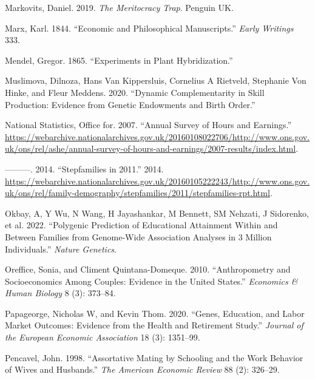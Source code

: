 \documentclass[
]{article}
\newlength{\cslhangindent}
\newlength{\cslentryspacingunit} %
\newenvironment{CSLReferences}[2] %
 {%
  \setlength{\parindent}{0pt}
  \ifodd #1
  \let\oldpar\par
  \def\par{\hangindent=\cslhangindent\oldpar}
  \fi
  \setlength{\parskip}{#2\cslentryspacingunit}
 }%
 {}
\theoremstyle{definition}
\theoremstyle{definition}
\theoremstyle{definition}
\theoremstyle{definition}
\theoremstyle{remark}
\begin{document}
\begin{CSLReferences}{1}{0}
\leavevmode{}%
Markovits, Daniel. 2019. \emph{The Meritocracy Trap}. Penguin UK.

\leavevmode{}%
Marx, Karl. 1844. {``Economic and Philosophical Manuscripts.''} \emph{Early Writings} 333.

\leavevmode{}%
Mendel, Gregor. 1865. {``Experiments in Plant Hybridization.''}

\leavevmode{}%
Muslimova, Dilnoza, Hans Van Kippersluis, Cornelius A Rietveld, Stephanie Von Hinke, and Fleur Meddens. 2020. {``Dynamic Complementarity in Skill Production: Evidence from Genetic Endowments and Birth Order.''}

\leavevmode{}%
National Statistics, Office for. 2007. {``Annual Survey of Hours and Earnings.''} \url{https://webarchive.nationalarchives.gov.uk/20160108022706/http://www.ons.gov.uk/ons/rel/ashe/annual-survey-of-hours-and-earnings/2007-results/index.html}.

\leavevmode{}%
---------. 2014. {``Stepfamilies in 2011.''} 2014. \url{https://webarchive.nationalarchives.gov.uk/20160105222243/http://www.ons.gov.uk/ons/rel/family-demography/stepfamilies/2011/stepfamilies-rpt.html}.

\leavevmode{}%
Okbay, A, Y Wu, N Wang, H Jayashankar, M Bennett, SM Nehzati, J Sidorenko, et al. 2022. {``Polygenic Prediction of Educational Attainment Within and Between Families from Genome-Wide Association Analyses in 3 Million Individuals.''} \emph{Nature Genetics}.

\leavevmode{}%
Oreffice, Sonia, and Climent Quintana-Domeque. 2010. {``Anthropometry and Socioeconomics Among Couples: Evidence in the United States.''} \emph{Economics \& Human Biology} 8 (3): 373--84.

\leavevmode{}%
Papageorge, Nicholas W, and Kevin Thom. 2020. {``Genes, Education, and Labor Market Outcomes: Evidence from the Health and Retirement Study.''} \emph{Journal of the European Economic Association} 18 (3): 1351--99.

\leavevmode{}%
Pencavel, John. 1998. {``Assortative Mating by Schooling and the Work Behavior of Wives and Husbands.''} \emph{The American Economic Review} 88 (2): 326--29.


\end{CSLReferences}
\end{document}
